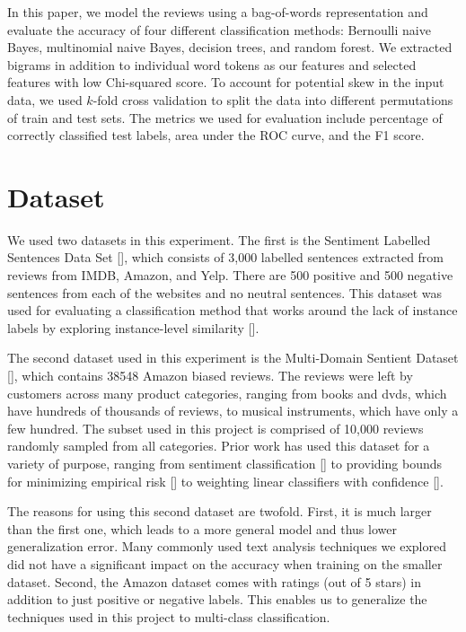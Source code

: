 \documentclass{article} %
\begin{document}
In this paper, we model the reviews using a bag-of-words representation and evaluate the accuracy of four different classification methods: Bernoulli naive Bayes, multinomial naive Bayes, decision trees, and random forest. We extracted bigrams in addition to individual word tokens as our features and selected features with low Chi-squared score. To account for potential skew in the input data, we used $k$-fold cross validation to split the data into different permutations of train and test sets. The metrics we used for evaluation include percentage of correctly classified test labels, area under the ROC curve, and the F1 score.

\section{Dataset}

We used two datasets in this experiment. The first is the Sentiment Labelled Sentences Data Set [], which consists of 3,000 labelled sentences extracted from reviews from IMDB, Amazon, and Yelp. There are 500 positive and 500 negative sentences from each of the websites and no neutral sentences. This dataset was used for evaluating a classification method that works around the lack of instance labels by exploring instance-level similarity [].

The second dataset used in this experiment is the Multi-Domain Sentient Dataset [], which contains 38548 Amazon biased reviews. The reviews were left by customers across many product categories, ranging from books and dvds, which have hundreds of thousands of reviews, to musical instruments, which have only a few hundred. The subset used in this project is comprised of 10,000 reviews randomly sampled from all categories. Prior work has used this dataset for a variety of purpose, ranging from sentiment classification [] to providing bounds for minimizing empirical risk [] to weighting linear classifiers with confidence [].

The reasons for using this second dataset are twofold. First, it is much larger than the first one, which leads to a more general model and thus lower generalization error. Many commonly used text analysis techniques we explored did not have a significant impact on the accuracy when training on the smaller dataset. Second, the Amazon dataset comes with ratings (out of 5 stars) in addition to just positive or negative labels. This enables us to generalize the techniques used in this project to multi-class classification.
\end{document}
